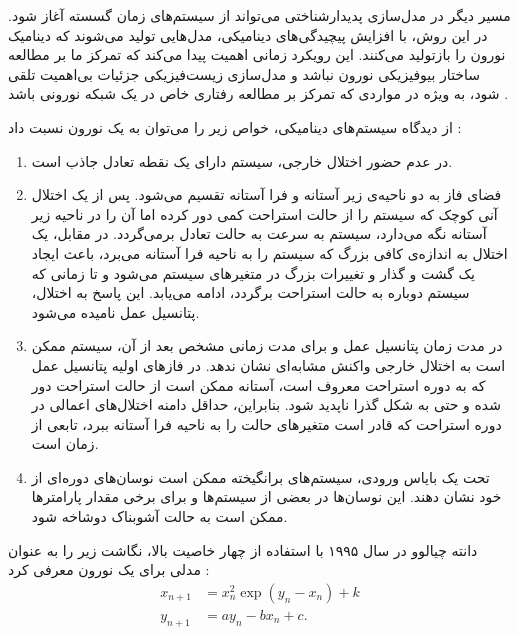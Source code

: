 مسیر دیگر در مدل‌سازی پدیدارشناختی می‌تواند از سیستم‌های زمان گسسته آغاز شود.
در این روش، با افزایش پیچیدگی‌های دینامیکی، مدل‌هایی تولید می‌شوند که دینامیک نورون را بازتولید می‌کنند.
این رویکرد زمانی اهمیت پیدا می‌کند که تمرکز ما بر مطالعه ساختار بیوفیزیکی نورون نباشد و مدل‌سازی زیست‌فیزیکی جزئیات بی‌اهمیت تلقی شود، به ویژه در مواردی که تمرکز بر مطالعه رفتاری خاص در یک شبکه نورونی باشد
\cite{ibarz2011,girardi-schappo2013}.

از دیدگاه سیستم‌های دینامیکی، خواص زیر را می‌توان به یک نورون نسبت داد \cite{chialvo1995}:
\begin{enumerate}
    \item در عدم حضور اختلال خارجی، سیستم دارای یک نقطه تعادل جاذب است.
    \item فضای فاز به دو ناحیه‌ی زیر آستانه و فرا آستانه تقسیم می‌شود.
          پس از یک اختلال آنی کوچک که سیستم را از حالت استراحت کمی دور کرده اما آن را در ناحیه زیر آستانه نگه می‌دارد، سیستم به سرعت به حالت تعادل برمی‌گردد.
          در مقابل، یک اختلال به اندازه‌ی کافی بزرگ که سیستم را به ناحیه فرا آستانه می‌برد، باعث ایجاد یک گشت و گذار و تغییرات بزرگ در متغیرهای سیستم می‌شود و تا زمانی که سیستم دوباره به حالت استراحت برگردد، ادامه می‌یابد.
          این پاسخ به اختلال، پتانسیل عمل نامیده می‌شود.
    \item در مدت زمان پتانسیل عمل و برای مدت زمانی مشخص بعد از آن، سیستم ممکن است به اختلال خارجی واکنش مشابه‌ای نشان ندهد.
          در فازهای اولیه پتانسیل عمل که به دوره استراحت معروف است، آستانه ممکن است از حالت استراحت دور شده و حتی به شکل گذرا ناپدید شود.
          بنابراین، حداقل دامنه اختلال‌های اعمالی در دوره استراحت که قادر است متغیرهای حالت را به ناحیه فرا آستانه ببرد، تابعی از زمان است.
    \item تحت یک بایاس ورودی، سیستم‌های برانگیخته ممکن است نوسان‌های دوره‌ای از خود نشان دهند.
          این نوسان‌ها در بعضی از سیستم‌ها و برای برخی مقدار پارامترها ممکن است به حالت آشوبناک دوشاخه شود.
\end{enumerate}

دانته چیالوو در سال ۱۹۹۵ با استفاده از چهار خاصیت بالا، نگاشت زیر را به عنوان مدلی برای یک نورون معرفی کرد
\cite{chialvo1995}:
\begin{subequations} \label{eq:chialvo_map}
    \begin{align}
        x_{n+1} & = x_{n}^{2} \exp(y_{n} - x_{n}) + k \\
        y_{n+1} & = a y_{n} - b x_{n} + c.
    \end{align}
\end{subequations}

